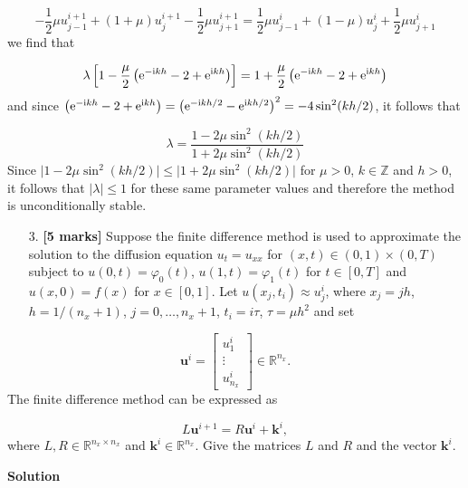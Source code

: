 \documentclass[12pt,a4paper]{article}
\begin{document}
\[
-\frac{1}{2}\mu u^{i+1}_{j-1} + (1 + \mu)u^{i+1}_j -\frac{1}{2}\mu u^{i+1}_{j+1} = 
\frac{1}{2}\mu u^{i}_{j-1} + (1 - \mu)u^{i}_j +\frac{1}{2}\mu u^{i}_{j+1} 
\]
we find that

\[
\lambda\left[1 - \frac{\mu}{2}\left({\rm e}^{-{\rm i}kh} - 2 +  {\rm e}^{{\rm i}kh} \right)    \right] = 1 + \frac{\mu}{2}\left({\rm e}^{-{\rm i}kh} - 2 +  {\rm e}^{{\rm i}kh} \right)  
\]
and since $\left({\rm e}^{-{\rm i}kh} - 2 +  {\rm e}^{{\rm i}kh} \right) = \left({\rm e}^{-{\rm i}kh/2} -  {\rm e}^{{\rm i}kh/2} \right)^2 = -4\sin^2(kh/2)$, it follows that

\[
\lambda = \frac{1 - 2\mu\sin^2(kh/2)}{1 + 2\mu\sin^2(kh/2)}
\]
Since $\vert 1 - 2\mu\sin^2(kh/2) \vert \leq \vert 1 + 2\mu\sin^2(kh/2)\vert$ for $\mu > 0$, $k \in \mathbb{Z}$ and $h > 0$, it follows that $\vert \lambda \vert \leq 1$ for these same parameter values and therefore the method is unconditionally stable.

\begin{itemize}
\item[3. ] \textbf{[5 marks]} Suppose the finite difference method is used to approximate the solution to the diffusion equation $u_t = u_{xx}$ for $(x, t) \in (0,1) \times (0,T)$ subject to $u(0,t) = \varphi_0(t)$, $u(1,t) = \varphi_1(t)$ for $t \in [0, T]$ and $u(x,0) = f(x)$ for $x \in [0, 1]$.  Let $u(x_j,t_i) \approx u^i_j$, where $x_j = jh$, $h = 1/(n_x + 1)$, $j = 0, \ldots, n_x+1$, $t_i = i\tau$, $\tau = \mu h^2$ and set

\end{itemize}
\[
\mathbf{u}^i = \begin{bmatrix}
u^{i}_{1} \\
\vdots \\
u^{i}_{n_x}
\end{bmatrix} \in \mathbb{R}^{n_x}.
\]
The finite difference method can be expressed as

\[
L\mathbf{u}^{i+1} = R\mathbf{u}^{i} + \mathbf{k}^{i},
\]
where $L, R \in \mathbb{R}^{n_x \times n_x}$ and $\mathbf{k}^{i} \in \mathbb{R}^{n_x}$.  Give the matrices $L$ and $R$ and the vector $\mathbf{k}^{i}$.

\textbf{Solution}
\end{document}
